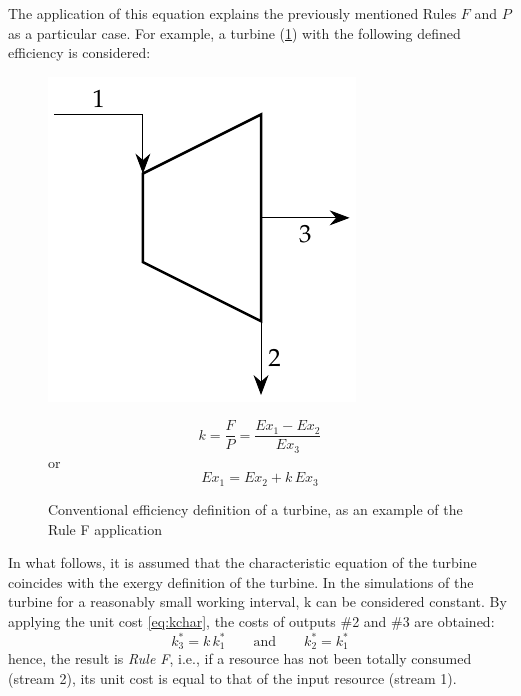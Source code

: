 \documentclass[energies,article,submit,moreauthors,pdftex]{Definitions/mdpi}
\begin{document}
The application of this equation explains the previously mentioned Rules $F$ and $P$ as a particular case. For example, a turbine (\cref{fig:turbine}) with the following defined efficiency is considered:
\begin{figure}[ht]
  \begin{minipage}[c]{0.50\linewidth}
   \centering
    \includegraphics[scale=0.7]{turbine}
  \end{minipage}
  \begin{minipage}[c]{0.48\linewidth}
    \centering
    \begin{equation*}
        k=\frac{F}{P}=\frac{Ex_1 - Ex_2}{Ex_3}
        \label{eq:turb}
    \end{equation*}
    or
    \begin{equation*}
        Ex_1=Ex_2+k\,Ex_3
    \end{equation*}
  \end{minipage}
  \caption{Conventional efficiency definition of a turbine, as an example of the Rule F application}
  \label{fig:turbine}
\end{figure}

In what follows, it is assumed that the characteristic equation of the turbine coincides with the exergy definition of the turbine. In the simulations of the turbine for a reasonably small working interval, k can be considered constant. By applying the unit cost \cref{eq:kchar}, the costs of outputs \#2 and \#3 are obtained:
\begin{equation}
    k_3^*=k\,k_1^* \qquad\text{and}\qquad k_2^*=k_1^*
\end{equation}
hence, the result is \emph{Rule F}, i.e., if a resource has not been totally consumed (stream 2), its unit cost is equal to that of the input resource (stream 1).
\end{document}
